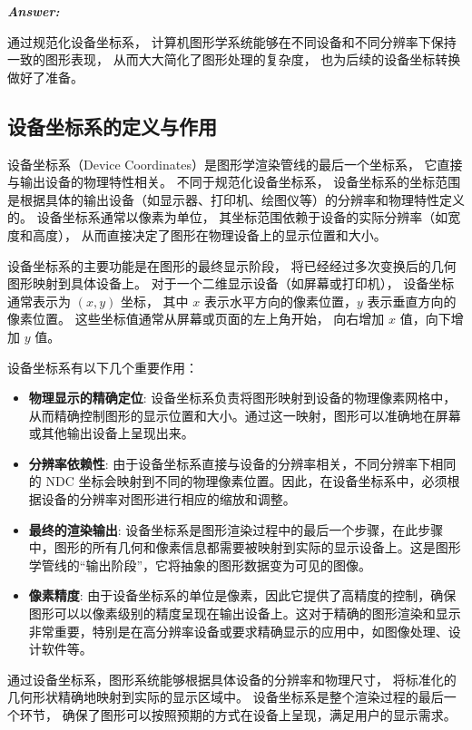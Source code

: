\documentclass[12pt]{article}
\newenvironment{Answer}{
  \vspace{12pt}
  {\large\textbf{\textit{\hspace{-12pt}Answer:}}}\par
  \vspace{8pt}
} {\vspace{24pt}}
\begin{document}
\begin{Answer}
通过规范化设备坐标系，
计算机图形学系统能够在不同设备和不同分辨率下保持一致的图形表现，
从而大大简化了图形处理的复杂度，
也为后续的设备坐标转换做好了准备。

\subsection*{设备坐标系的定义与作用}
\noindent

设备坐标系（Device Coordinates）是图形学渲染管线的最后一个坐标系，
它直接与输出设备的物理特性相关。
不同于规范化设备坐标系，
设备坐标系的坐标范围是根据具体的输出设备（如显示器、打印机、绘图仪等）的分辨率和物理特性定义的。
设备坐标系通常以像素为单位，
其坐标范围依赖于设备的实际分辨率（如宽度和高度），
从而直接决定了图形在物理设备上的显示位置和大小。

设备坐标系的主要功能是在图形的最终显示阶段，
将已经经过多次变换后的几何图形映射到具体设备上。
对于一个二维显示设备（如屏幕或打印机），
设备坐标通常表示为 $(x, y)$ 坐标，
其中 $x$ 表示水平方向的像素位置，$y$ 表示垂直方向的像素位置。
这些坐标值通常从屏幕或页面的左上角开始，
向右增加 $x$ 值，向下增加 $y$ 值。

设备坐标系有以下几个重要作用：
\begin{itemize}
    \item \textbf{物理显示的精确定位}: 设备坐标系负责将图形映射到设备的物理像素网格中，从而精确控制图形的显示位置和大小。通过这一映射，图形可以准确地在屏幕或其他输出设备上呈现出来。
    \item \textbf{分辨率依赖性}: 由于设备坐标系直接与设备的分辨率相关，不同分辨率下相同的 NDC 坐标会映射到不同的物理像素位置。因此，在设备坐标系中，必须根据设备的分辨率对图形进行相应的缩放和调整。
    \item \textbf{最终的渲染输出}: 设备坐标系是图形渲染过程中的最后一个步骤，在此步骤中，图形的所有几何和像素信息都需要被映射到实际的显示设备上。这是图形学管线的“输出阶段”，它将抽象的图形数据变为可见的图像。
    \item \textbf{像素精度}: 由于设备坐标系的单位是像素，因此它提供了高精度的控制，确保图形可以以像素级别的精度呈现在输出设备上。这对于精确的图形渲染和显示非常重要，特别是在高分辨率设备或要求精确显示的应用中，如图像处理、设计软件等。
\end{itemize}

通过设备坐标系，图形系统能够根据具体设备的分辨率和物理尺寸，
将标准化的几何形状精确地映射到实际的显示区域中。
设备坐标系是整个渲染过程的最后一个环节，
确保了图形可以按照预期的方式在设备上呈现，满足用户的显示需求。


\end{Answer}
\end{document}
